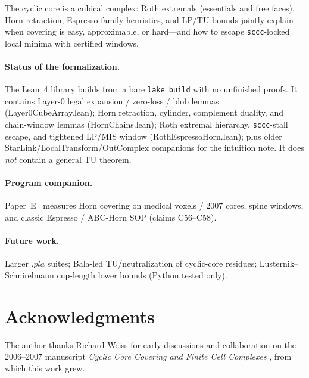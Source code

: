 \documentclass[11pt]{article}
\begin{document}
The cyclic core is a cubical complex: Roth extremals (essentials and free faces),
Horn retraction, Espresso-family heuristics, and LP/TU bounds jointly explain
when covering is easy, approximable, or hard---and how to escape
\texttt{sccc}-locked local minima with certified windows.

\paragraph{Status of the formalization.}  The Lean~4 library builds from a bare
\texttt{lake build} with no unfinished proofs.  It contains Layer-0 legal
expansion / zero-loss / blob lemmas (\textsf{Layer0CubeArray.lean}); Horn
retraction, cylinder, complement duality, and chain-window lemmas
(\textsf{HornChains.lean}); Roth extremal hierarchy, \texttt{sccc}-stall escape,
and tightened LP/MIS window (\textsf{RothEspressoHorn.lean}); plus older
\textsf{StarLink}/\textsf{LocalTransform}/\textsf{OutComplex} companions for the
intuition note.  It does \emph{not} contain a general TU theorem.

\paragraph{Program companion.}  Paper~E~\cite{paperE} measures Horn covering on
medical voxels / 2007 cores, spine windows, and classic Espresso / ABC-Horn SOP
(claims C56--C58).

\paragraph{Future work.}  Larger $.pla$ suites; Bala-led TU/neutralization of
cyclic-core residues; Lusternik--Schnirelmann cup-length lower bounds (Python
tested only).

\section*{Acknowledgments}
The author thanks Richard Weiss for early discussions and collaboration on
the 2006--2007 manuscript \emph{Cyclic Core Covering and Finite Cell Complexes}
\cite{coppola2006sat,coppola2007}, from which this work grew.
\end{document}
